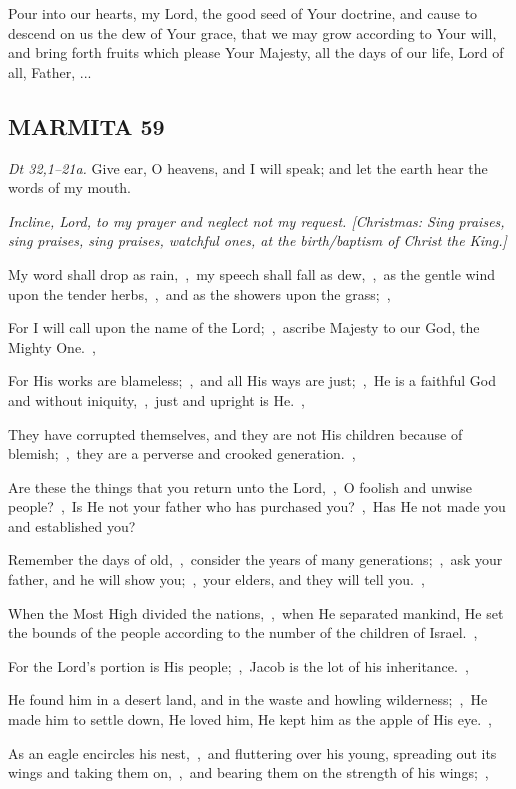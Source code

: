 \documentclass[12pt,twoside,a5paper]{article}
\newcommand{\marmita}[1]{\subsection*{MARMITA {#1}}}
\newcommand{\qanona}[1]{{\liturgicalhint{Qanona.} \emph{#1}}}
\newcommand{\slota}[1]{\liturgicalhint{Slota.} #1}
\newcommand{\scripture}[1]{\emph{#1.}}
\begin{document}
\slota{Pour into our hearts, my Lord, the good seed of Your doctrine, and cause to descend on us the dew of Your grace, that we may grow according to Your will, and bring forth fruits which please Your Majesty, all the days of our life, Lord of all, Father, ...}

\marmita{59}

\begin{normalparskip}
  \scripture{Dt 32,1--21a} Give ear, O heavens, and I will speak; and let the earth hear the words of my mouth.

  \qanona{Incline, Lord, to my prayer and neglect not my request. [Christmas: Sing praises, sing praises, sing praises, watchful ones, at the birth/baptism of Christ the King.]}

  My word shall drop as rain,~\sep\ my speech shall fall as dew,~\sep\ as the gentle wind upon the tender herbs,~\sep\ and as the showers upon the grass;~\sep

  For I will call upon the name of the Lord;~\sep\ ascribe Majesty to our God, the Mighty One.~\sep

  For His works are blameless;~\sep\ and all His ways are just;~\sep\ He is a faithful God and without iniquity,~\sep\ just and upright is He.~\sep

  They have corrupted themselves, and they are not His children because of blemish;~\sep\ they are a perverse and crooked generation.~\sep

  Are these the things that you return unto the Lord,~\sep\ O foolish and unwise people?~\sep\ Is He not your father who has purchased you?~\sep\ Has He not made you and established you?

  Remember the days of old,~\sep\ consider the years of many generations;~\sep\ ask your father, and he will show you;~\sep\ your elders, and they will tell you.~\sep

  When the Most High divided the nations,~\sep\ when He separated mankind, He set the bounds of the people according to the number of the children of Israel.~\sep

  For the Lord's portion is His people;~\sep\ Jacob is the lot of his inheritance.~\sep

  He found him in a desert land, and in the waste and howling wilderness;~\sep\ He made him to settle down, He loved him, He kept him as the apple of His eye.~\sep

  As an eagle encircles his nest,~\sep\ and fluttering over his young, spreading out its wings and taking them on,~\sep\ and bearing them on the strength of his wings;~\sep


\end{normalparskip}
\end{document}
